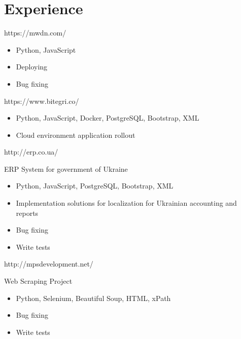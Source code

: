 \documentclass{resume}
\begin{document}



\section{Experience}


https://mwdn.com/
\begin{itemize}
  \item Python, JavaScript
  \item Deploying
  \item Bug fixing
  
\end{itemize}


https://www.bitegri.co/
\begin{itemize}
  \item Python, JavaScript, Docker, PostgreSQL, Bootstrap, XML
  \item Cloud environment application rollout
  
\end{itemize}


http://erp.co.ua/

ERP System for government of Ukraine 
\begin{itemize}
  \item Python, JavaScript, PostgreSQL, Bootstrap, XML
  \item Implementation solutions for localization for Ukrainian accounting and reports
  \item Bug fixing
  \item Write tests
\end{itemize}


http://mpsdevelopment.net/

Web Scraping Project
\begin{itemize}
  \item Python, Selenium, Beautiful Soup, HTML, xPath
  \item Bug fixing
  \item Write tests
\end{itemize}
\end{document}
